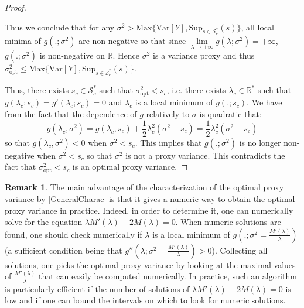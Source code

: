 \documentclass[a4paper, 10pt]{article}
\newcommand{\beq}{\begin{equation}}
\newcommand{\eeq}{\end{equation}}
\theoremstyle{definition}
\newtheorem{remark}{Remark}[section]
\begin{document}
\begin{proof}
\begin{itemize}
\end{itemize}
Thus we conclude that for any $\sigma^2>\text{Max}\{\text{Var}[Y],\text{Sup}_{s\in \mathcal{S}_c^*}(s)\}$, all local minima of $g(.;\sigma^2)$ are non-negative so that since $\underset{\lambda\to \pm \infty}{\lim} g(\lambda;\sigma^2)=+\infty$, $g(.;\sigma^2)$ is non-negative on $\mathbb{R}$. Hence $\sigma^2$ is a variance proxy and thus $\sigma_{\text{opt}}^2\leq \text{Max}\{\text{Var}[Y],\text{Sup}_{s\in \mathcal{S}_c^*}(s)\}$.

\medskip

 Thus, there exists $s_c\in \mathcal{S}_c^*$ such that $\sigma_{\text{opt}}^2<s_c$, i.e. there exists $\lambda_c\in \mathbb{R}^*$ such that $g(\lambda_c;s_c)=g'(\lambda_c;s_c)=0$ and $\lambda_c$ is a local minimum of $g(.;s_c)$. We have from the fact that the dependence of $g$ relatively to $\sigma$ is quadratic that:
\beq g(\lambda_c,\sigma^2)=g(\lambda_c,s_c) +\frac{1}{2}\lambda_c^2 (\sigma^2-s_c)=\frac{1}{2}\lambda_c^2 (\sigma^2-s_c)\eeq
so that $g(\lambda_c,\sigma^2)<0$ when $\sigma^2<s_c$. This implies that $g(.;\sigma^2)$ is no longer non-negative when $\sigma^2<s_c$ so that $\sigma^2$ is not a proxy variance. This contradicts the fact that $\sigma_{\text{opt}}^2<s_c$ is an optimal proxy variance.
\end{proof}


\begin{remark}The main advantage of the characterization of the optimal proxy variance by \autoref{GeneralCharac} is that it gives a numeric way to obtain the optimal proxy variance in practice. Indeed, in order to determine it, one can numerically solve for the equation $\lambda M'(\lambda)-2M(\lambda)=0$. When numeric solutions are found, one should check numerically if $\lambda$ is a local minimum of $g\left(.;\sigma^2=\frac{M'(\lambda)}{\lambda}\right)$ (a sufficient condition being that $g''\left(\lambda;\sigma^2=\frac{M'(\lambda)}{\lambda}\right)>0$). Collecting all solutions, one picks the optimal proxy variance by looking at the maximal values of $\frac{M'(\lambda)}{\lambda}$ that can easily be computed numerically. In practice, such an algorithm is particularly efficient if the number of solutions of $\lambda M'(\lambda)-2M(\lambda)=0$ is low and if one can bound the intervals on which to look for numeric solutions.  
\end{remark}
\end{document}
